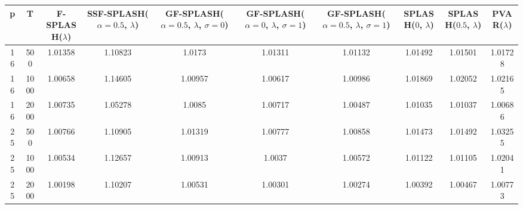 \begin{tabular}{cccccccccc}
\hline
  p  &  T   &  F-SPLASH($\lambda$)  &  SSF-SPLASH($\alpha=0.5$, $\lambda$)  &  GF-SPLASH($\alpha=0.5$, $\lambda$, $\sigma=0$)  &  GF-SPLASH($\alpha=0$, $\lambda$, $\sigma=1$)  &  GF-SPLASH($\alpha=0.5$, $\lambda$, $\sigma=1$)  &  SPLASH($0$, $\lambda$)  &  SPLASH($0.5$, $\lambda$)  &  PVAR($\lambda$)  \\
\hline
 16  & 500  &        1.01358        &                1.10823                &                      1.0173                      &                    1.01311                     &                     1.01132                      &         1.01492          &          1.01501           &      1.01728      \\
 16  & 1000 &        1.00658        &                1.14605                &                     1.00957                      &                    1.00617                     &                     1.00986                      &         1.01869          &          1.02052           &      1.02165      \\
 16  & 2000 &        1.00735        &                1.05278                &                      1.0085                      &                    1.00717                     &                     1.00487                      &         1.01035          &          1.01037           &      1.00686      \\
 25  & 500  &        1.00766        &                1.10905                &                     1.01319                      &                    1.00777                     &                     1.00858                      &         1.01473          &          1.01492           &      1.03255      \\
 25  & 1000 &        1.00534        &                1.12657                &                     1.00913                      &                     1.0037                     &                     1.00572                      &         1.01122          &          1.01105           &      1.02041      \\
 25  & 2000 &        1.00198        &                1.10207                &                     1.00531                      &                    1.00301                     &                     1.00274                      &         1.00392          &          1.00467           &      1.00773      \\
\hline
\end{tabular}